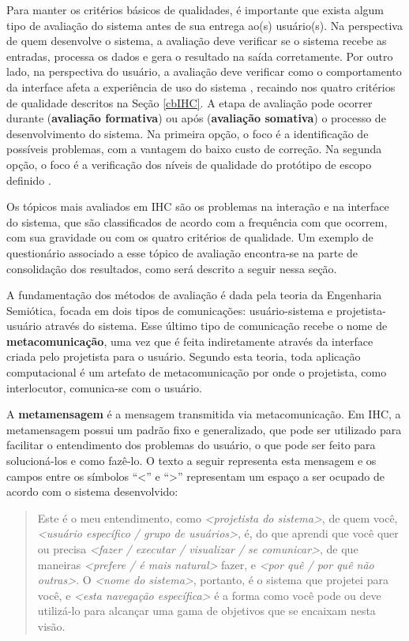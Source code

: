 \indent Para manter os critérios básicos de qualidades, é importante que exista algum tipo de avaliação do sistema antes de sua entrega ao(s) usuário(s). Na perspectiva de quem desenvolve o sistema, a avaliação deve verificar se o sistema recebe as entradas, processa os dados e gera o resultado na saída corretamente. Por outro lado, na perspectiva do usuário, a avaliação deve verificar como o comportamento da interface afeta a experiência de uso do sistema \cite{IHCbook}, recaindo nos quatro critérios de qualidade descritos na Seção \ref{cbIHC}. A etapa de avaliação pode ocorrer durante (\textbf{avaliação formativa}) ou após (\textbf{avaliação somativa}) o processo de desenvolvimento do sistema. Na primeira opção, o foco é a identificação de possíveis problemas, com a vantagem do baixo custo de correção. Na segunda opção, o foco é a verificação dos níveis de qualidade do protótipo de escopo definido \cite{IHCbook}.

\indent Os tópicos mais avaliados em IHC são os problemas na interação e na interface do sistema, que são classificados de acordo com a frequência com que ocorrem, com sua gravidade ou com os quatro critérios de qualidade. Um exemplo de questionário associado a esse tópico de avaliação encontra-se na parte de consolidação dos resultados, como será descrito a seguir nessa seção.

\indent A fundamentação dos métodos de avaliação é dada pela teoria da Engenharia Semiótica, focada em dois tipos de comunicações: usuário-sistema e projetista-usuário através do sistema. Esse último tipo de comunicação recebe o nome de \textbf{metacomunicação}, uma vez que é feita indiretamente através da interface criada pelo projetista para o usuário. Segundo esta teoria, toda aplicação computacional é um artefato de metacomunicação por onde o projetista, como interlocutor, comunica-se com o usuário.

\indent A \textbf{metamensagem} é a mensagem transmitida via metacomunicação. Em IHC, a metamensagem possui um padrão fixo e generalizado, que pode ser utilizado para facilitar o entendimento dos problemas do usuário, o que pode ser feito para solucioná-los e como fazê-lo. O texto a seguir representa esta mensagem e os campos entre os símbolos ``<'' e ``>'' representam um espaço a ser ocupado de acordo com o sistema desenvolvido:

\begin{quote}
Este é o meu entendimento, como \textit{<projetista do sistema>}, de quem você, \textit{<usuário específico / grupo de usuários>}, é, do que aprendi que você quer ou precisa \textit{<fazer / executar / visualizar / se comunicar>}, de que maneiras \textit{<prefere / é mais natural>} fazer, e \textit{<por quê / por quê não outras>}. O \textit{<nome do sistema>}, portanto, é o sistema que projetei para você, e \textit{<esta navegação específica>} é a forma como você pode ou deve utilizá-lo para alcançar uma gama de objetivos que se encaixam nesta visão.
\end{quote}

